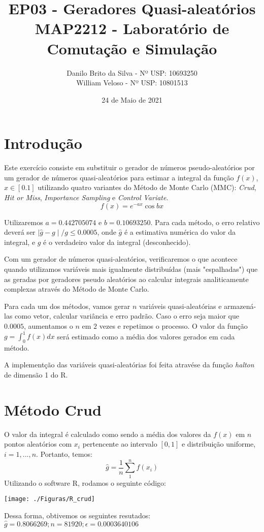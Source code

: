 \documentclass{article}
\title{EP03 - Geradores Quasi-aleatórios\\
MAP2212 - Laboratório de Comutação e Simulação}
\author{Danilo Brito da Silva - Nº USP: 10693250\\
William Veloso - Nº USP: 10801513}
\date{24 de Maio de 2021}
\begin{document}
\maketitle

\section{Introdução}
Este exercício consiste em substituir o gerador de números pseudo-aleatórios por um gerador de números quasi-aleatórios para estimar a integral da função $f(x)$, $x \in [0.1]$ utilizando quatro variantes do Método de Monte Carlo (MMC): \textit{Crud}, \textit{Hit or Miss}, \textit{Importance Sampling} e \textit{Control Variate}.
\begin{equation}
    f(x) = e^{-a x}\cos{bx}
\end{equation}


Utilizaremos $a=0.442705074$ e $b=0.10693250$. Para cada método, o erro relativo deverá ser $\mid\hat{g} - g\mid/g \leq 0.0005$, onde $\hat{g}$ é a estimativa numérica do valor da integral, e $g$ é o verdadeiro valor da integral (desconhecido).


Com um gerador de números quasi-aleatórios, verificaremos o que acontece quando utilizamos variáveis mais igualmente distribuídas (mais "espalhadas") que as geradas por geradores pseudo aleatórios ao calcular integrais analiticamente complexas através do Método de Monte Carlo.


Para cada um dos métodos, vamos gerar $n$ variáveis quasi-aleatórias e armazená-las como vetor, calcular variância e erro padrão. Caso o erro seja maior que $0.0005$, aumentamos o $n$ em $2$ vezes e repetimos o processo. O valor da função $g = \int_{0}^{1}f(x)dx$ será estimado como a média dos valores gerados em cada método.

A implementção das variáveis quasi-aleatórias foi feita atravése da função \textit{halton} de dimensão 1 do R.


\section{Método Crud}

O valor da integral é calculado como sendo a média dos valores da $f(x)$ em $n$ pontos aleatórios com $x_i$ pertencente ao intervalo $[0, 1]$ e distribuição uniforme, $i=1,...,n$. Portanto, temos:
$$
\hat{g}=\frac{1}{n}\sum_{1}^{n}f(x_i)
$$
Utilizando o software R, rodamos o seguinte código:
\begin{center}
\texttt{[image: ./Figuras/R\_crud]}\\
\end{center}
Dessa forma, obtivemos os seguintes resutados:\\
 $\hat{g} = 0.8066269; n = 81920;    \epsilon = 0.0003640106$
\end{document}

